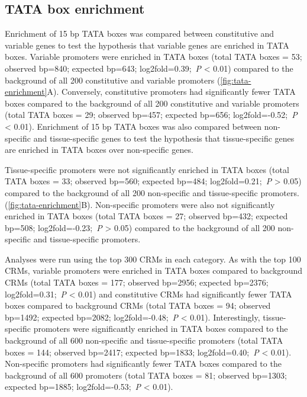 \documentclass[../main.tex]{subfiles}
\begin{document}
{{\subsection{TATA box enrichment}

Enrichment of 15 bp TATA boxes was compared between constitutive and
variable genes to test the hypothesis that variable genes are enriched in TATA boxes.
Variable promoters were enriched in TATA boxes (total TATA boxes = 53; observed bp=840; expected bp=643; log2fold=0.39;~\textit{P} \textless{} 0.01) compared to the background of all 200 constitutive and variable promoters
(\autoref{fig:tata-enrichment}A).
Conversely, constitutive promoters had significantly fewer TATA boxes compared to the background of all 200 constitutive and variable promoters (total TATA boxes = 29; observed bp=457; expected bp=656; log2fold=-0.52;~\textit{P} \textless{} 0.01).
Enrichment of 15 bp TATA boxes was also compared between non\hyp{}specific and
tissue\hyp{}specific genes to test the hypothesis that tissue\hyp{}specific genes are enriched in TATA boxes over non\hyp{}specific genes.

Tissue\hyp{}specific promoters were not significantly enriched in TATA boxes (total TATA boxes = 33; observed bp=560; expected bp=484; log2fold=0.21;~\textit{P} \textgreater{} 0.05) compared to the background of all 200 non\hyp{}specific and tissue\hyp{}specific promoters.
(\autoref{fig:tata-enrichment}B).
Non\hyp{}specific promoters were also not significantly enriched in TATA boxes (total TATA boxes = 27; observed bp=432; expected bp=508; log2fold=-0.23;~\textit{P} \textgreater{} 0.05) compared to the background of all 200 non\hyp{}specific and tissue\hyp{}specific promoters.

Analyses were run using the top 300 CRMs in each category.
As with the top 100 CRMs, variable promoters were enriched in TATA boxes compared to background CRMs (total TATA boxes = 177; observed bp=2956; expected bp=2376; log2fold=0.31;~\textit{P} \textless{} 0.01) and constitutive CRMs had significantly fewer TATA boxes compared to background CRMs (total TATA boxes = 94; observed bp=1492; expected bp=2082; log2fold=-0.48;~\textit{P} \textless{} 0.01).
Interestingly, tissue\hyp{}specific promoters were significantly enriched in TATA boxes compared to the background of all 600 non\hyp{}specific and tissue\hyp{}specific promoters (total TATA boxes = 144; observed bp=2417; expected bp=1833; log2fold=0.40;~\textit{P} \textless{} 0.01).
Non\hyp{}specific promoters had significantly fewer TATA boxes compared to the background of all 600 promoters (total TATA boxes = 81; observed bp=1303; expected bp=1885; log2fold=-0.53;~\textit{P} \textless{} 0.01).

}}
\end{document}
